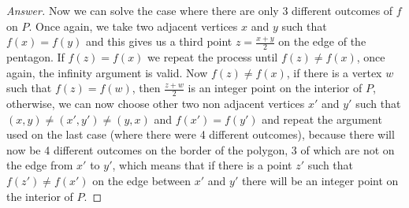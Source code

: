 \documentclass[12pt]{article}
\begin{document}
\begin{proof}[Answer]
Now we can solve the case where there are only 3 different outcomes of $f$ on $P$. Once again, we take two adjacent vertices $x$ and $y$ such that $f(x) = f(y)$ and this gives us a third point $z = \frac{x+y}{2}$ on the edge of the pentagon. If $f(z) = f(x)$ we repeat the process until $f(z) \neq f(x)$, once again, the infinity argument is valid. Now $f(z) \neq f(x)$, if there is a vertex $w$ such that $f(z) = f(w)$, then $\frac{z+w}{2}$ is an integer point on the interior of $P$, otherwise, we can now choose other two non adjacent vertices $x'$ and $y'$ such that $(x,y) \neq (x',y') \neq (y,x)$ and $f(x') = f(y')$ and repeat the argument used on the last case (where there were 4 different outcomes), because there will now be 4 different outcomes on the border of the polygon, 3 of which are not on the edge from $x'$ to $y'$, which means that if there is a point $z'$ such that $f(z') \neq f(x')$ on the edge between $x'$ and $y'$ there will be an integer point on the interior of $P$.
\end{proof}
\end{document}
